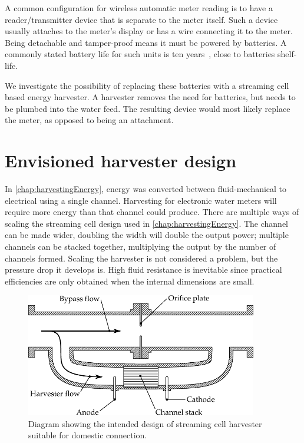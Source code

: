   A common configuration for wireless automatic meter reading is to have a reader/transmitter device that is separate to the meter itself.
  Such a device usually attaches to the meter's display or has a wire connecting it to the meter.
  Being detachable and tamper-proof means it must be powered by batteries.
  A commonly stated battery life for such units is ten years~\cite{BMeters2014}, close to batteries shelf-life.

  We investigate the possibility of replacing these batteries with a streaming cell based energy harvester.
  A harvester removes the need for batteries, but needs to be plumbed into the water feed.
  The resulting device would most likely replace the meter, as opposed to being an attachment. 

  \section{Envisioned harvester design}

    In \cref{chap:harvestingEnergy}, energy was converted between fluid-mechanical to electrical using a single channel.
    Harvesting for electronic water meters will require more energy than that channel could produce.
    There are multiple ways of scaling the streaming cell design used in \cref{chap:harvestingEnergy}.
    The channel can be made wider, doubling the width will double the output power;
    multiple channels can be stacked together, multiplying the output by the number of channels formed.
    Scaling the harvester is not considered a problem, but the pressure drop it develops is.
    High fluid resistance is inevitable since practical efficiencies are only obtained when the internal dimensions are small.

    \begin{figure}
      \centering
      \includegraphics[width=0.9\textwidth]{content/pt1/02-WirelessWaterMeter/graphics/harvester}
      \caption{\label{fig:Diagram_harvester}Diagram showing the intended design of streaming cell harvester suitable for domestic connection.}
    \end{figure}

